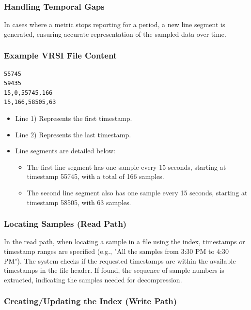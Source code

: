 \documentclass[conference]{IEEEtran}
\begin{document}
\subsubsection{Handling Temporal Gaps}

In cases where a metric stops reporting for a period, a new line segment is generated, ensuring accurate representation of the sampled data over time.
\vspace{5pt}
\subsubsection{Example VRSI File Content}

\begin{verbatim}
55745
59435
15,0,55745,166
15,166,58505,63
\end{verbatim}


\begin{itemize}
    \item Line 1) Represents the first timestamp.
    \item Line 2) Represents the last timestamp.
    \item Line segments are detailed below:
    \begin{itemize}
        \item The first line segment has one sample every 15 seconds, starting at timestamp 55745, with a total of 166 samples.
        \item The second line segment also has one sample every 15 seconds, starting at timestamp 58505, with 63 samples.
    \end{itemize}
\end{itemize}
\vspace{5pt}
\subsubsection{Locating Samples (Read Path)}

In the read path, when locating a sample in a file using the index, timestamps or timestamp ranges are specified (e.g., "All the samples from 3:30 PM to 4:30 PM"). The system checks if the requested timestamps are within the available timestamps in the file header. If found, the sequence of sample numbers is extracted, indicating the samples needed for decompression.
\vspace{5pt}
\subsubsection{Creating/Updating the Index (Write Path)}
\end{document}
